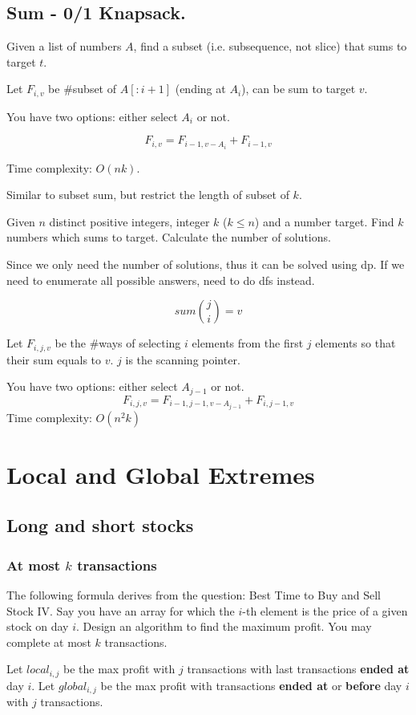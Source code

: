 \subsection{Sum - 0/1 Knapsack.} 
 Given a list of numbers $A$, find a subset (i.e. subsequence, not slice) that sums to target $t$.

Let $F_{i, v}$ be \#subset of $A[:i+1]$ (ending at $A_i$), can be sum to target $v$.

You have two options: either select $A_i$ or not.
 
$$
F_{i, v} = F_{i-1, v-A_{i}} + F_{i-1, v}
$$

Time complexity: $O(nk)$.

 Similar to subset sum, but restrict the length of subset of $k$.

Given $n$ distinct positive integers, integer $k$ ($k \leq n$) and a number target. Find $k$ numbers which sums to target. Calculate the number of solutions. 

Since we only need the number of solutions, thus it can be solved using dp. If we need to enumerate all possible answers, need to do dfs instead. 

$$
sum{j \choose i} = v
$$

Let $F_{i, j, v}$ be the \#ways of selecting $i$ elements from the first $j$ elements so that their sum equals to $v$. $j$ is the scanning pointer.

You have two options: either select $A_{j-1}$ or not.
$$
F_{i, j, v} = F_{i-1, j-1, v-A_{j-1}} + F_{i, j-1, v}
$$
Time complexity: $O(n^2 k)$
\section{Local and Global Extremes}
\subsection{Long and short stocks}
\subsubsection{At most $k$ transactions}

The following formula derives from the question: Best Time to Buy and Sell Stock IV. Say you have an array for which the $i$-th element is the price of a given stock on day $i$. Design an algorithm to find the maximum profit. You may complete at most $k$ transactions. 

Let $local_{i, j}$ be the max profit with $j$ transactions with last transactions \textbf{ended at} day $i$. Let $global_{i, j}$ be the max profit with transactions \textbf{ended at} or \textbf{before} day $i$ with $j$ transactions. 

